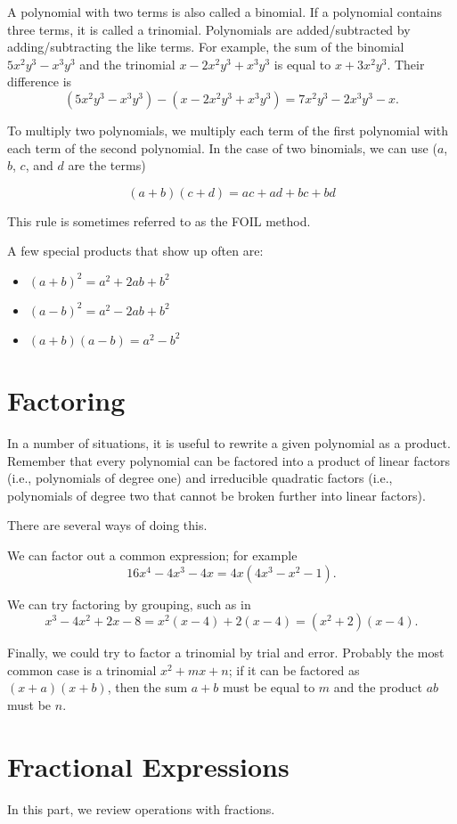 \documentclass{ximera}
\begin{document}
A polynomial with two terms is also called a binomial.  If a polynomial contains three terms, it is called a trinomial.  Polynomials are added/subtracted
by adding/subtracting the like terms.  For example, the sum of the binomial $5x^2y^3-x^3y^3$ and the trinomial $x - 2x^2y^3 + x^3y^3$ is equal to
$x + 3x^2y^3$.  Their difference is
\[\left(5x^2y^3-x^3y^3\right) - \left(x - 2x^2y^3 + x^3y^3\right) = 7x^2y^3 - 2x^3y^3-x. \]

To multiply two polynomials, we multiply each term of the first polynomial with each term of the second polynomial.  In the case of two binomials, we can use
($a$, $b$, $c$, and $d$ are the terms)

$$(a+b)(c+d) = ac + ad + bc + bd$$

This rule is sometimes referred to as the FOIL method.

A few special products that show up often are:

\begin{itemize}
	\item $\left(a+b\right)^2 = a^2 + 2ab + b^2$
	\item $\left(a-b\right)^2 = a^2 - 2ab + b^2$
	\item  $\left(a+b\right)\left(a-b\right) = a^2 - b^2$
\end{itemize}

\section{Factoring}
In a number of situations, it is useful to rewrite a given polynomial as a product.  Remember that every polynomial can be factored into a product of linear factors (i.e., polynomials of degree one) and irreducible quadratic factors (i.e., polynomials of degree two that cannot be broken further into linear factors).

There are several ways of doing this.

We can factor out a common expression; for example
\[ 16x^4 - 4x^3 - 4x = 4x\left(4x^3-x^2-1\right).\]

We can try factoring by grouping, such as in
\[ x^3 - 4x^2 + 2x - 8 = x^2(x-4) + 2(x-4) = (x^2+2)(x-4).\]

Finally, we could try to factor a trinomial by trial and error.  Probably the most common case is a trinomial $x^2 + mx + n$; if it can be factored as $(x+a)(x+b)$, then the sum $a+b$ must be equal to $m$ and the product $ab$ must be $n$.

\section{Fractional Expressions}
In this part, we review operations with fractions.
\end{document}

